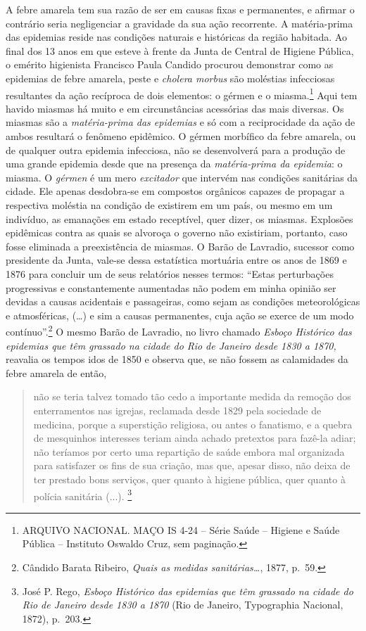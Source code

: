 A febre amarela tem sua razão de ser em causas fixas e permanentes, e
afirmar o contrário seria negligenciar a gravidade da sua ação
recorrente. A matéria-prima das epidemias reside nas condições naturais
e históricas da região habitada. Ao final dos 13 anos em que esteve à
frente da Junta de Central de Higiene Pública, o emérito higienista
Francisco Paula Candido procurou demonstrar como as epidemias de febre
amarela, peste e \emph{cholera morbus} são moléstias infecciosas
resultantes da ação recíproca de dois elementos: o gérmen e o
miasma.\footnote{ARQUIVO NACIONAL. MAÇO IS 4-24 -- Série Saúde --
  Higiene e Saúde Pública -- Instituto Oswaldo Cruz, sem paginação.}
Aqui tem havido miasmas há muito e em circunstâncias acessórias das mais
diversas. Os miasmas são a \emph{matéria-prima das epidemias} e só com a
reciprocidade da ação de ambos resultará o fenômeno epidêmico. O gérmen
morbífico da febre amarela, ou de qualquer outra epidemia infecciosa,
não se desenvolverá para a produção de uma grande epidemia desde que na
presença da \emph{matéria-prima da epidemia}: o miasma. O \emph{gérmen}
é um mero \emph{excitador} que intervém nas condições sanitárias da
cidade. Ele apenas desdobra-se em compostos orgânicos capazes de
propagar a respectiva moléstia na condição de existirem em um país, ou
mesmo em um indivíduo, as emanações em estado receptível, quer dizer, os
miasmas. Explosões epidêmicas contra as quais se alvoroça o governo não
existiriam, portanto, caso fosse eliminada a preexistência de miasmas. O
Barão de Lavradio, sucessor como presidente da Junta, vale-se dessa
estatística mortuária entre os anos de 1869 e 1876 para concluir um de
seus relatórios nesses termos: ``Estas perturbações progressivas e
constantemente aumentadas não podem em minha opinião ser devidas a
causas acidentais e passageiras, como sejam as condições meteorológicas
e atmosféricas, (\ldots{}) e sim a causas permanentes, cuja ação se
exerce de um modo contínuo''.\footnote{Cândido Barata Ribeiro,
  \emph{Quais as medidas sanitárias\ldots{}}, 1877, p.~59.} O mesmo
Barão de Lavradio, no livro chamado \emph{Esboço Histórico das epidemias
que têm grassado na cidade do Rio de Janeiro desde 1830 a 1870,}
reavalia os tempos idos de 1850 e observa que, se não fossem as
calamidades da febre amarela de então,

\begin{quote}
não se teria talvez tomado tão cedo a importante medida da remoção dos
enterramentos nas igrejas, reclamada desde 1829 pela sociedade de
medicina, porque a superstição religiosa, ou antes o fanatismo, e a
quebra de mesquinhos interesses teriam ainda achado pretextos para
fazê-la adiar; não teríamos por certo uma repartição de saúde embora mal
organizada para satisfazer os fins de sua criação, mas que, apesar
disso, não deixa de ter prestado bons serviços, quer quanto à higiene
pública, quer quanto à polícia sanitária (...). \footnote{José P. Rego,
  \emph{Esboço Histórico das epidemias que têm grassado na cidade do Rio
  de Janeiro desde 1830 a 1870} (Rio de Janeiro, Typographia Nacional,
  1872), p.~203.}
\end{quote}

